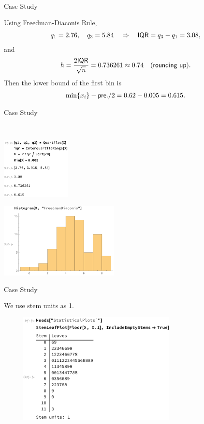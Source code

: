 \begin{frame}{Case Study}

 Using Freedman-Diaconis Rule,
\begin{align*}
q_1 = 2.76, \quad q_3 = 5.84 \quad \Rightarrow\quad \mathsf{IQR} = q_3 - q_1 = 3.08,
\end{align*}
and
\begin{align*}
h = \frac{2\mathsf{IQR}}{\sqrt{n}} = 0.736261 \approx 0.74 \quad (\mathsf{rounding\ up}).
\end{align*}
Then the lower bound of the first bin is
\begin{align*}
\min\{x_i\} - \mathsf{pre.} / 2 = 0.62 - 0.005 = 0.615.
\end{align*}

\end{frame}


\begin{frame}{Case Study}

 \\
\begin{minipage}{0.3\linewidth}
	\centering
	\includegraphics[width=3.5cm]{./images/rc4fig7.pdf}
\end{minipage}
\begin{minipage}{0.6\linewidth}
	\centering
	\includegraphics[width=6cm]{./images/rc4fig8.pdf}
\end{minipage}

\end{frame}


\begin{frame}{Case Study}

 We use stem units as 1.
\begin{figure}[htbp]
	\centering
	\includegraphics[width=8cm]{./images/rc4fig9.pdf}
\end{figure}

\end{frame}


